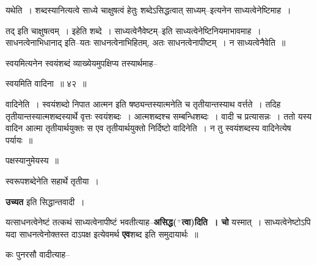 \documentclass[article,12pt,a4paper]{memoir}
\newcommand{\add}[1]{($^{+}$#1)}
\begin{document}
	  \endgroup
	 

	  \pstart {}यथेति । शब्दस्यानित्यत्वे साध्ये चाक्षुषत्वं हेतुः शब्देऽसिद्धत्वात् साध्यम्--इत्यनेन साध्यत्वेनेष्टिमाह ।
	\pend
        

	  \pstart तद् इति चाक्षुषत्वम् । इहेति शब्दे । साध्यत्वेनैवेष्टम्--इति साध्यत्वेनेष्टिनियमाभावमाह । साधनत्वेनाभिधानाद् इति--यतः साधनत्वेनाभिहितम्, अतः साधनत्वेनापीष्टम् । न साध्यत्वेनैवेति ॥
	\pend
        

	  \pstart स्वयमित्यनेन स्वयंशब्दं व्याख्येयमुपक्षिप्य तस्यार्थमाह--
	\pend
        
	  \bigskip
	  \begingroup
	

	  \pstart स्वयमिति वादिना ॥ ४२ ॥
	\pend
      
	  \endgroup
	 

	  \pstart वादिनेति । स्वयंशब्दो निपात आत्मन इति षष्ठ्यन्तस्यात्मनेति च तृतीयान्तस्याथ वर्त्तते । तदिह तृतीयान्तस्यात्मशब्दस्यार्थे वृत्तः स्वयंशब्दः । आत्मशब्दश्च सम्बन्धिशब्दः । वादी च प्रत्यासन्नः । ततो यस्य वादिन आत्मा तृतीयार्थयुक्तः स एव तृतीयार्थयुक्तो निर्दिष्टो वादिनेति । न तु स्वयंशब्दस्य वादिनेत्येष पर्यायः ॥
	\pend
      
	  \endgroup
	

	  \pstart पक्षस्यानुमेयस्य ॥
	\pend
      

	  \pstart स्वरूपशब्देनेति सहार्थे तृतीया ।
	\pend
      

	  \pstart \leavevmode{} \textbf{उच्यत} इति सिद्धान्तवादी ।
	\pend
      

	  \pstart यत्साधनत्वेनेष्टं तत्कथं साध्यत्वेनापीष्टं भवतीत्याह--\textbf{असिद्ध\add{त्वा}दिति । चो} यस्मात् । साध्यत्वेनेष्टोऽपि यदा साधनत्वेनोक्तस्त दाऽपक्ष इत्येवमर्थ \textbf{एव}शब्द इति समुदायार्थः ॥
	\pend
	  \bigskip
	  \begingroup
	

	  \pstart कः पुनरसौ वादीत्याह--
	\pend
        
\end{document}
